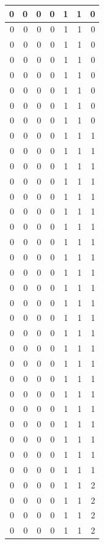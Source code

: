 \documentclass[
  12pt,
]{krantz}
\begin{document}
\begin{tabular}{r|r|r|r|r|r|r}
\hline
0 & 0 & 0 & 0 & 1 & 1 & 0\\
\hline
0 & 0 & 0 & 0 & 1 & 1 & 0\\
\hline
0 & 0 & 0 & 0 & 1 & 1 & 0\\
\hline
0 & 0 & 0 & 0 & 1 & 1 & 0\\
\hline
0 & 0 & 0 & 0 & 1 & 1 & 0\\
\hline
0 & 0 & 0 & 0 & 1 & 1 & 0\\
\hline
0 & 0 & 0 & 0 & 1 & 1 & 0\\
\hline
0 & 0 & 0 & 0 & 1 & 1 & 0\\
\hline
0 & 0 & 0 & 0 & 1 & 1 & 1\\
\hline
0 & 0 & 0 & 0 & 1 & 1 & 1\\
\hline
0 & 0 & 0 & 0 & 1 & 1 & 1\\
\hline
0 & 0 & 0 & 0 & 1 & 1 & 1\\
\hline
0 & 0 & 0 & 0 & 1 & 1 & 1\\
\hline
0 & 0 & 0 & 0 & 1 & 1 & 1\\
\hline
0 & 0 & 0 & 0 & 1 & 1 & 1\\
\hline
0 & 0 & 0 & 0 & 1 & 1 & 1\\
\hline
0 & 0 & 0 & 0 & 1 & 1 & 1\\
\hline
0 & 0 & 0 & 0 & 1 & 1 & 1\\
\hline
0 & 0 & 0 & 0 & 1 & 1 & 1\\
\hline
0 & 0 & 0 & 0 & 1 & 1 & 1\\
\hline
0 & 0 & 0 & 0 & 1 & 1 & 1\\
\hline
0 & 0 & 0 & 0 & 1 & 1 & 1\\
\hline
0 & 0 & 0 & 0 & 1 & 1 & 1\\
\hline
0 & 0 & 0 & 0 & 1 & 1 & 1\\
\hline
0 & 0 & 0 & 0 & 1 & 1 & 1\\
\hline
0 & 0 & 0 & 0 & 1 & 1 & 1\\
\hline
0 & 0 & 0 & 0 & 1 & 1 & 1\\
\hline
0 & 0 & 0 & 0 & 1 & 1 & 1\\
\hline
0 & 0 & 0 & 0 & 1 & 1 & 1\\
\hline
0 & 0 & 0 & 0 & 1 & 1 & 1\\
\hline
0 & 0 & 0 & 0 & 1 & 1 & 1\\
\hline
0 & 0 & 0 & 0 & 1 & 1 & 2\\
\hline
0 & 0 & 0 & 0 & 1 & 1 & 2\\
\hline
0 & 0 & 0 & 0 & 1 & 1 & 2\\
\hline
0 & 0 & 0 & 0 & 1 & 1 & 2\\

\end{tabular}
\end{document}
